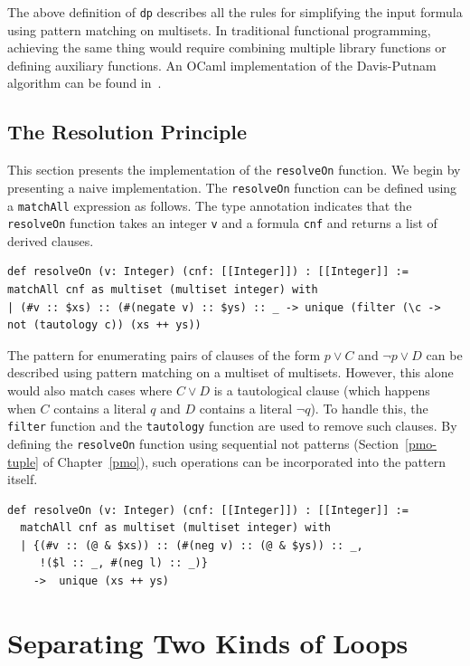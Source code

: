 The above definition of \lstinline{dp} describes all the rules for simplifying the input formula using pattern matching on multisets.
In traditional functional programming, achieving the same thing would require combining multiple library functions or defining auxiliary functions.
An OCaml implementation of the Davis-Putnam algorithm can be found in~\cite{harrison2009handbook}.

\subsection{The Resolution Principle}

This section presents the implementation of the \lstinline{resolveOn} function.
We begin by presenting a naive implementation.
The \lstinline{resolveOn} function can be defined using a \lstinline{matchAll} expression as follows.
The type annotation indicates that the \lstinline{resolveOn} function takes an integer \lstinline{v} and a formula \lstinline{cnf} and returns a list of derived clauses.
\begin{lstlisting}[language=egison,numbers=none]
def resolveOn (v: Integer) (cnf: [[Integer]]) : [[Integer]] := matchAll cnf as multiset (multiset integer) with
| (#v :: $xs) :: (#(negate v) :: $ys) :: _ -> unique (filter (\c -> not (tautology c)) (xs ++ ys))
\end{lstlisting}
The pattern for enumerating pairs of clauses of the form $p \lor C$ and $\neg p \lor D$ can be described using pattern matching on a multiset of multisets.
However, this alone would also match cases where $C \lor D$ is a tautological clause (which happens when $C$ contains a literal $q$ and $D$ contains a literal $\neg q$).
To handle this, the \lstinline{filter} function and the \lstinline{tautology} function are used to remove such clauses.
By defining the \lstinline{resolveOn} function using sequential not patterns (Section~\ref{pmo-tuple} of Chapter~\ref{pmo}), such operations can be incorporated into the pattern itself.
\begin{lstlisting}[language=egison,numbers=none]
def resolveOn (v: Integer) (cnf: [[Integer]]) : [[Integer]] :=
  matchAll cnf as multiset (multiset integer) with
  | {(#v :: (@ & $xs)) :: (#(neg v) :: (@ & $ys)) :: _,
     !($l :: _, #(neg l) :: _)}
    ->  unique (xs ++ ys)
\end{lstlisting}

\section{Separating Two Kinds of Loops}\label{essence-pmo}

